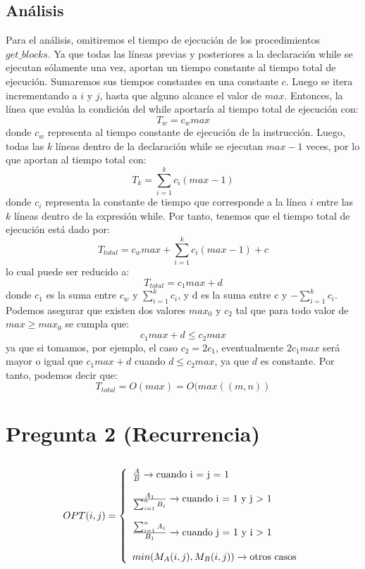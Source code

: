 \documentclass{article}
\begin{document}
\subsection{Análisis}
Para el análisis, omitiremos el tiempo de ejecución de los procedimientos $get\_blocks$.
Ya que todas las líneas previas y posteriores a la declaración while se ejecutan sólamente una vez, aportan un tiempo constante al tiempo total de ejecución. Sumaremos sus tiempos constantes en una constante $c$. Luego se itera incrementando a $i$ y $j$, hasta que alguno alcance el valor de $max$. Entonces, la línea que evalúa la condición del while aportaría al tiempo total de ejecución con:
\[T_w = c_wmax\]
donde $c_w$ representa al tiempo constante de ejecución de la instrucción. Luego, todas las $k$ líneas dentro de la declaración while se ejecutan $max - 1$ veces, por lo que aportan al tiempo total con:
\[T_k = \sum_{i=1}^{k} c_i(max-1)\]
donde $c_i$ representa la constante de tiempo que corresponde a la línea $i$ entre las $k$ líneas dentro de la expresión while. Por tanto, tenemos que el tiempo total de ejecución está dado por:
\[T_{total} = c_wmax + \sum_{i=1}^{k} c_i(max-1) + c\]
lo cual puede ser reducido a:
\[T_{total} = c_1max + d\]
donde $c_1$ es la suma entre $c_w$ y \(\sum_{i=1}^{k} c_i\), y d es la suma entre c y \(-\sum_{i=1}^{k} c_i\). Podemos asegurar que existen dos valores $max_0$ y $c_2$ tal que para todo valor de $max \geq max_0$ se cumpla que:
\[c_1max + d \leq c_2max\]
ya que si tomamos, por ejemplo, el caso $c_2 = 2c_1$, eventualmente $2c_1max$ será mayor o igual que $c_1max + d$ cuando $d \leq c_2max$, ya que $d$ es constante. Por tanto, podemos decir que:
\[T_{total} = O (max) = O (max((m, n))\]
\newpage

\section{Pregunta 2 (Recurrencia)}
\subsection{}
  \[
    \\OPT(i,j)=\left\{
                \begin{array}{ll}
                  \frac{A}{B} \xrightarrow[]{} \textrm {cuando i = j = 1}\\
                  \\
                  \frac{A_1}{ \sum_{i=1}^{n}B_{i} } \xrightarrow[]{} \textrm {cuando i = 1 y j $>$ 1}\\
                  \\
                  \frac{ \sum_{i=1}^{n}A_{i}} {B_1} \xrightarrow[]{} \textrm {cuando j = 1 y i $>$ 1}\\
                  \\
                  min(M_A(i,j), M_B(i,j))\xrightarrow[]{} \textrm {otros casos}\\
                
                \end{array}
              \right.
  \]
  
\end{document}
